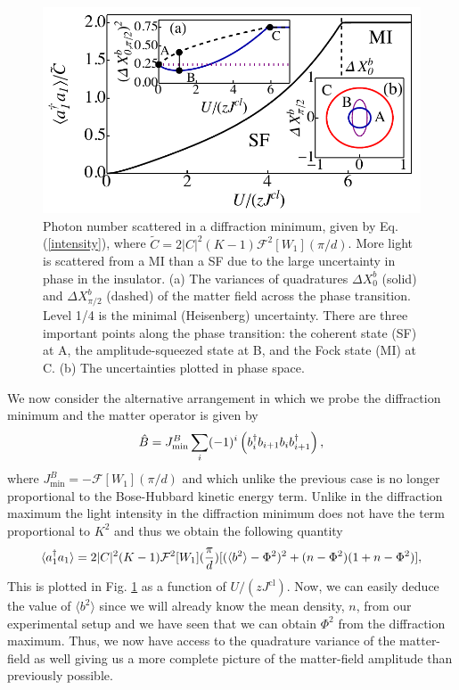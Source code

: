 \begin{figure}[htbp!]
  \centering
  \includegraphics[width=\linewidth]{Quads}
  \captionsetup{justification=centerlast,font=small}
  \caption[Mean-Field Matter Quadratures]{Photon number scattered in a
    diffraction minimum, given by Eq. (\ref{intensity}), where
    $\tilde{C} = 2 |C|^2 (K-1) \mathcal{F}^2 [W_1](\pi/d)$.  More
    light is scattered from a MI than a SF due to the large
    uncertainty in phase in the insulator. (a) The variances of
    quadratures $\Delta X^b_0$ (solid) and $\Delta X^b_{\pi/2}$
    (dashed) of the matter field across the phase transition. Level
    1/4 is the minimal (Heisenberg) uncertainty. There are three
    important points along the phase transition: the coherent state
    (SF) at A, the amplitude-squeezed state at B, and the Fock state
    (MI) at C. (b) The uncertainties plotted in phase space.}
	\label{Quads}
\end{figure}

We now consider the alternative arrangement in which we probe the
diffraction minimum and the matter operator is given by
\begin{equation}
  \label{eq:Bmin}
  \hat{B} = J^B_\mathrm{min} \sum_i (-1)^i \left( b^\dagger_i b_{i+1} b_i
    b^\dagger_{i+1} \right),
\end{equation}
where $J^B_\mathrm{min} = - \mathcal{F}[W_1](\pi / d)$ and which
unlike the previous case is no longer proportional to the Bose-Hubbard
kinetic energy term. Unlike in the diffraction maximum the light
intensity in the diffraction minimum does not have the term
proportional to $K^2$ and thus we obtain the following quantity
\begin{equation}
  \label{intensity}
  \langle a^\dagger_1 a_1 \rangle = 2 |C|^2(K-1) \mathcal{F}^2[W_1]
  (\frac{\pi}{d}) [ ( \langle b^2 \rangle - \Phi^2 )^2 + ( n - \Phi^2 ) ( 1 +n - \Phi^2 ) ],
\end{equation}
This is plotted in Fig. \ref{Quads} as a function of
$U/(zJ^\text{cl})$. Now, we can easily deduce the value of
$\langle b^2 \rangle$ since we will already know the mean density,
$n$, from our experimental setup and we have seen that we can obtain
$\Phi^2$ from the diffraction maximum. Thus, we now have access to the
quadrature variance of the matter-field as well giving us a more
complete picture of the matter-field amplitude than previously
possible.

